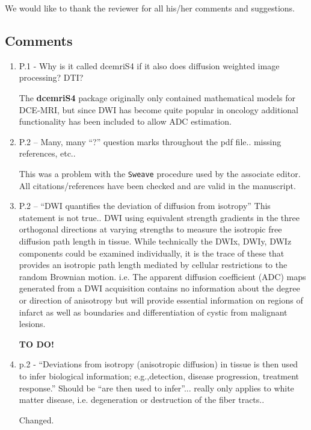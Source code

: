 \documentclass[11pt]{article}
\begin{document}
We would like to thank the reviewer for all his/her comments and
suggestions.

\subsection*{Comments}

\begin{enumerate}

\item P.1 - Why is it called dcemriS4 if it also does diffusion
  weighted image processing? DTI?

  The \textbf{dcemriS4} package originally only contained
  mathematical models for DCE-MRI, but since DWI has become quite
  popular in oncology additional functionality has been included to
  allow ADC estimation.  

\item P.2 – Many, many ``?'' question marks throughout the pdf
  file.. missing references, etc..

  This was a problem with the \texttt{Sweave} procedure used by the
  associate editor.  All citations/references have been checked and
  are valid in the manuscript.

\item P.2 – ``DWI quantifies the deviation of diffusion from
  isotropy'' This statement is not true..  DWI using equivalent
  strength gradients in the three orthogonal directions at varying
  strengths to measure the isotropic free diffusion path length in
  tissue. While technically the DWIx, DWIy, DWIz components could be
  examined individually, it is the trace of these that provides an
  isotropic path length mediated by cellular restrictions to the
  random Brownian motion.  i.e. The apparent diffusion coefficient
  (ADC) maps generated from a DWI acquisition contains no information
  about the degree or direction of anisotropy but will provide
  essential information on regions of infarct as well as boundaries
  and differentiation of cystic from malignant lesions.

  \textbf{TO DO!}

\item p.2 - ``Deviations from isotropy (anisotropic diffusion) in
  tissue is then used to infer biological information; e.g.,detection,
  disease progression, treatment response.''  Should be ``are then
  used to infer''... really only applies to white matter disease, i.e.
  degeneration or destruction of the fiber tracts..

  Changed.


\end{enumerate}
\end{document}
